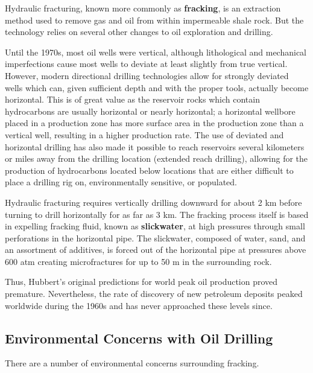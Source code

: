 Hydraulic fracturing, known more commonly as \textbf{fracking}, is an extraction method used to remove gas and oil from within impermeable shale rock. But the technology relies on several other changes to oil exploration and drilling. 

Until the 1970s, most oil wells were vertical, although lithological and mechanical imperfections cause most wells to deviate at least slightly from true vertical. However, modern directional drilling technologies allow for strongly deviated wells which can, given sufficient depth and with the proper tools, actually become horizontal. This is of great value as the reservoir rocks which contain hydrocarbons are usually horizontal or nearly horizontal; a horizontal wellbore placed in a production zone has more surface area in the production zone than a vertical well, resulting in a higher production rate. The use of deviated and horizontal drilling has also made it possible to reach reservoirs several kilometers or miles away from the drilling location (extended reach drilling), allowing for the production of hydrocarbons located below locations that are either difficult to place a drilling rig on, environmentally sensitive, or populated.

Hydraulic fracturing requires vertically drilling downward for about 2 km before turning to drill horizontally for as far as 3 km.  The fracking process itself is based in expelling fracking fluid, known as \textbf{slickwater}, at high pressures through small perforations in the horizontal pipe. The slickwater, composed of water, sand, and an assortment of additives, is forced out of the horizontal pipe at pressures above 600 atm creating microfractures for up to 50 m in the surrounding rock.

Thus, Hubbert's original predictions for world peak oil production proved premature. Nevertheless, the rate of discovery of new petroleum deposits peaked worldwide during the 1960s and has never approached these levels since.

\subsection{Environmental Concerns with Oil Drilling}

There are a number of environmental concerns surrounding fracking. 


